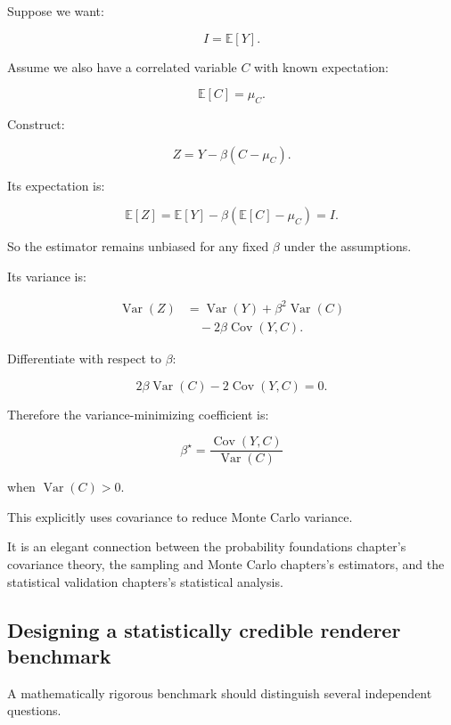\hypertarget{02-foundations-ii-ch031-control-variates}{}

Suppose we want:

\[
 I=\mathbb E[Y].
\]

Assume we also have a correlated variable \(C\) with known expectation:

\[
 \mathbb E[C]=\mu_C.
\]

Construct:

\[
 \boxed{ Z=Y-\beta(C-\mu_C) }.
\]

Its expectation is:

\[
 \mathbb E[Z] = \mathbb E[Y]-\beta(\mathbb E[C]-\mu_C) =I.
\]

So the estimator remains unbiased for any fixed \(\beta\) under the assumptions.

Its variance is:

\[
 \begin{aligned} \operatorname{Var}(Z) &= \operatorname{Var}(Y) +\beta^2\operatorname{Var}(C)\\ &\quad-2\beta\operatorname{Cov}(Y,C). \end{aligned}
\]

Differentiate with respect to \(\beta\):

\[
 2\beta\operatorname{Var}(C) -2\operatorname{Cov}(Y,C)=0.
\]

Therefore the variance-minimizing coefficient is:

\[
 \boxed{ \beta^\star= \frac{\operatorname{Cov}(Y,C)} {\operatorname{Var}(C)} }
\]

when \(\operatorname{Var}(C)>0\).

This explicitly uses covariance to reduce Monte Carlo variance.

It is an elegant connection between the probability foundations chapter's covariance theory, the sampling and Monte Carlo chapters's estimators, and the statistical validation chapters's statistical analysis.

\subsection{Designing a statistically credible renderer benchmark}\label{02-foundations-ii-ch031-designing-a-statistically-credible-renderer-benchmark}

\hypertarget{02-foundations-ii-ch031-designing-a-statistically-credible-renderer-benchmark}{}

A mathematically rigorous benchmark should distinguish several independent questions.

